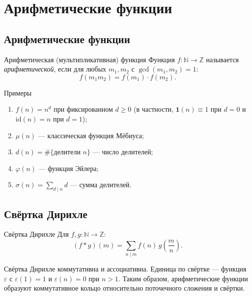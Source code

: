 
\section{Арифметические функции}

\subsection{Арифметические функции}

\begin{Definition}{Арифметическая (мультипликативная) функция}{}
	Функция $f\colon\mathbb N\to\mathbb Z$ называется \emph{арифметической}, если для любых $m_1,m_2$ с $\gcd(m_1,m_2)=1$:
	\[
	f(m_1 m_2)=f(m_1)\cdot f(m_2).
	\]
\end{Definition}

\begin{Example}{Примеры}{}
	\begin{enumerate}
		\item $f(n)=n^d$ при фиксированном $d\ge 0$ (в частности, $\mathbf 1(n)\equiv 1$ при $d=0$ и $\mathrm{id}(n)=n$ при $d=1$);
		\item $\mu(n)$ — классическая функция Мёбиуса;
		\item $d(n)=\#\{\text{делители }n\}$ — число делителей;
		\item $\varphi(n)$ — функция Эйлера;
		\item $\sigma(n)=\sum_{d\mid n}d$ — сумма делителей.
	\end{enumerate}
\end{Example}

\subsection{Свёртка Дирихле}

\begin{Definition}{Свёртка Дирихле}{}
	Для $f,g\colon\mathbb N\to\mathbb Z$:
	\[
	(f*g)(m)=\sum_{n\mid m}f(n)\,g\!\left(\frac{m}{n}\right).
	\]
\end{Definition}

\begin{Remark}{}{}
	Свёртка Дирихле коммутативна и ассоциативна. Единица по свёртке — функция $\varepsilon$ с $\varepsilon(1)=1$ и $\varepsilon(n)=0$ при $n>1$. Таким образом, арифметические функции образуют коммутативное кольцо относительно поточечного сложения и свёртки.
\end{Remark}


